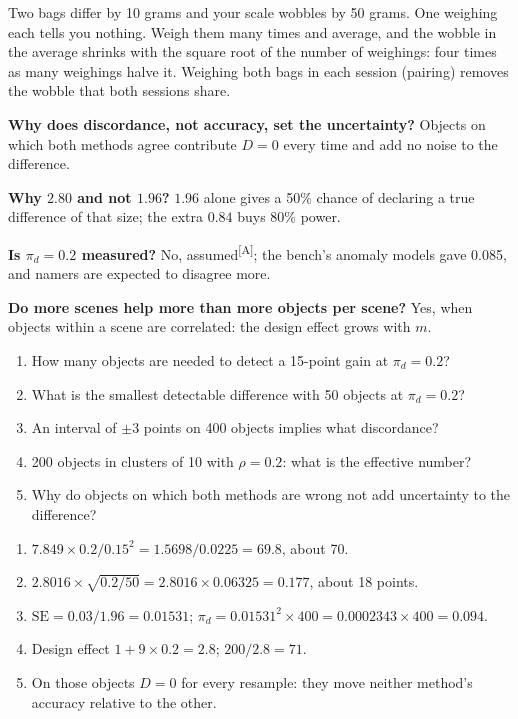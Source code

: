 \documentclass[11pt,a4paper,oneside,openany]{book}
\newcommand{\assm}{\textsuperscript{\textsf{\scriptsize[A]}}}
\begin{document}
\begin{analogy}
Two bags differ by 10 grams and your scale wobbles by 50 grams. One weighing each tells you nothing. Weigh them many times and average, and the wobble in the average shrinks with
the square root of the number of weighings: four times as many weighings halve it. Weighing both bags in each session (pairing) removes the wobble that both sessions share.
\end{analogy}

\begin{confusions}
\textbf{Why does discordance, not accuracy, set the uncertainty?} Objects on which both methods agree contribute $D=0$ every time and add no noise to the difference.

\textbf{Why $2.80$ and not $1.96$?} $1.96$ alone gives a 50\% chance of declaring a true difference of that size; the extra $0.84$ buys 80\% power.

\textbf{Is $\pi_d=0.2$ measured?} No, assumed\assm; the bench's anomaly models gave 0.085, and namers are expected to disagree more.

\textbf{Do more scenes help more than more objects per scene?} Yes, when objects within a scene are correlated: the design effect grows with $m$.
\end{confusions}

\begin{checkyourself}
\begin{enumerate}
\item How many objects are needed to detect a 15-point gain at $\pi_d=0.2$?
\item What is the smallest detectable difference with 50 objects at $\pi_d=0.2$?
\item An interval of $\pm3$ points on 400 objects implies what discordance?
\item 200 objects in clusters of 10 with $\rho=0.2$: what is the effective number?
\item Why do objects on which both methods are wrong not add uncertainty to the difference?
\end{enumerate}
\end{checkyourself}

\begin{answers}
\begin{enumerate}
\item $7.849\times0.2/0.15^2=1.5698/0.0225=69.8$, about 70.
\item $2.8016\times\sqrt{0.2/50}=2.8016\times0.06325=0.177$, about 18 points.
\item $\mathrm{SE}=0.03/1.96=0.01531$; $\pi_d=0.01531^2\times400=0.0002343\times400=0.094$.
\item Design effect $1+9\times0.2=2.8$; $200/2.8=71$.
\item On those objects $D=0$ for every resample: they move neither method's accuracy relative to the other.
\end{enumerate}
\end{answers}
\end{document}
